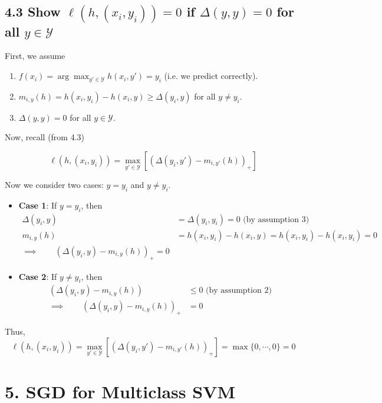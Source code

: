 \documentclass[paper=a4, fontsize=11pt]{scrartcl} %
\numberwithin{equation}{section} %
\numberwithin{figure}{section} %
\numberwithin{table}{section} %
\begin{document}
\subsection*{4.3 Show $\ell(h, (x_i, y_i)) = 0$ if $\Delta(y,y) = 0$ for all $y \in \mathcal{Y}$}

First, we assume
\begin{enumerate}
\item $f(x_i) = \arg \max_{y' \in \mathcal{Y}} h(x_i, y') = y_i$ (i.e. we predict correctly).
\item $m_{i,y}(h) = h(x_i, y_i) - h(x_i, y) \geq \Delta(y_i,y)$ for all $y \ne y_i$. 
\item $\Delta(y,y) = 0$ for all $y \in \mathcal{Y}$.
\end{enumerate}

Now, recall (from 4.3)

\[\ell(h, (x_i, y_i)) =  \max_{y' \in \mathcal{Y}} \left[\left(\Delta(y_i, y') - m_{i,y'}(h)\right)_+\right]\]

Now we consider two cases: $y = y_i$ and $y \ne y_i$.

\begin{itemize}
\item \textbf{Case 1}: If $y = y_i$, then
\begin{align*}
\Delta(y_i, y) &= \Delta(y_i, y_i) = 0 \textrm{ (by assumption 3)}\\
m_{i, y}(h) &= h(x_i, y_i) - h(x_i, y) = h(x_i, y_i) - h(x_i, y_i) = 0 \\
\implies \qquad{} \left(\Delta(y_i, y) - m_{i,y}(h)\right)_+ = 0
\end{align*}
\item \textbf{Case 2}: If $y \ne y_i$, then
\begin{align*}
(\Delta(y_i, y) - m_{i, y}(h)) & \leq 0 \textrm{ (by assumption 2)} \\
\implies \qquad{} \left(\Delta(y_i, y) - m_{i,y}(h)\right)_+ &= 0
\end{align*}
\end{itemize}

Thus, 
\[\ell(h, (x_i, y_i)) =  \max_{y' \in \mathcal{Y}} \left[\left(\Delta(y_i, y') - m_{i,y'}(h)\right)_+\right] = \max \{0, \cdots, 0\} = 0 \]


\section*{5. SGD for Multiclass SVM}
\end{document}
